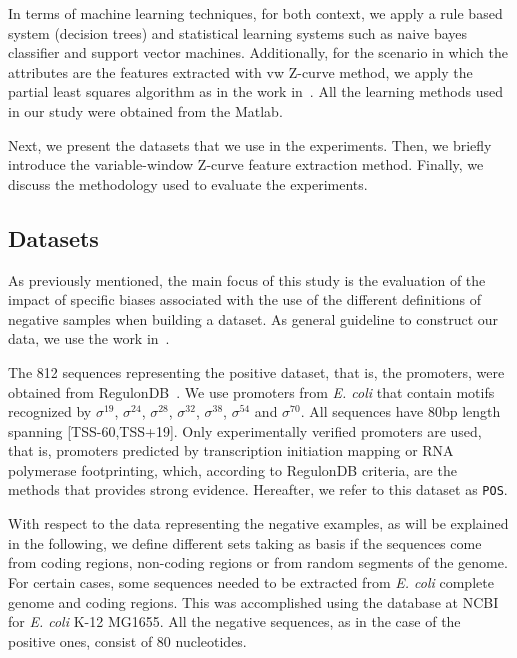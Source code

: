 \documentclass[runningheads,a4paper]{llncs}
\begin{document}
In terms of machine learning techniques, for both context, we apply  a rule based system (decision trees) and statistical learning systems such as naive bayes classifier and  support vector machines.  Additionally, for the scenario in which the attributes are the features extracted with  vw Z-curve  method, we apply the partial least squares algorithm as in the work in~\cite{song2011}.  All the learning methods used in our study were obtained from the Matlab.

Next, we present the datasets that we use in the experiments. Then, we briefly introduce the variable-window Z-curve feature extraction method. Finally, we discuss the methodology used to evaluate the experiments.

\subsection{Datasets}

As previously mentioned, the main focus  of this study is the evaluation of the impact of specific biases associated with  the use of the different definitions  of negative samples when building a dataset. As general guideline to construct our data, we use the work in~\cite{gordon2003}. 

The 812 sequences representing the positive dataset, that is, the promoters, were obtained from RegulonDB~\cite{gamacastro2008}. We use promoters from {\it E. coli} that contain motifs recognized by ${\sigma }^{{19}}$, ${\sigma }^{{24}}$, ${\sigma }^{{28}}$, ${\sigma }^{{32}}$, ${\sigma }^{{38}}$, ${\sigma }^{{54}}$ and ${\sigma }^{{70}}$. All sequences have 80bp length spanning [TSS-60,TSS+19]. Only experimentally verified promoters are used, that is,  promoters predicted by transcription initiation mapping or RNA polymerase footprinting, which, according to RegulonDB criteria, are the methods that provides strong evidence. Hereafter, we refer to this dataset as {\tt POS}.

With respect to the data representing the negative examples, as will be explained in the following, we define different sets taking as basis if the sequences come from coding regions, non-coding regions or from random segments of the genome.  For certain cases,  some sequences needed to be extracted from {\it E. coli } complete genome and coding regions. This was accomplished  using  the database at  NCBI ~\cite{ncbi2012} for {\it E. coli } K-12 MG1655. All the negative sequences, as in the case of the positive ones, consist of 80 nucleotides.\\
\end{document}
